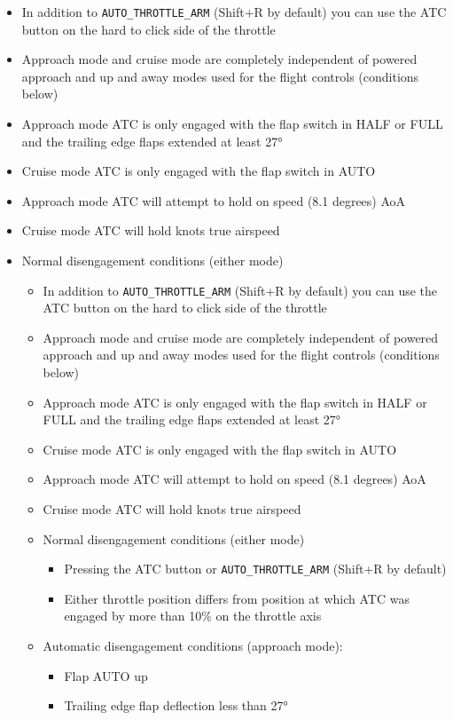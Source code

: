 \documentclass[11pt]{article}
\begin{document}
\begin{itemize}
\item In addition to \verb!AUTO_THROTTLE_ARM! (Shift+R by default) you can use the ATC button on the hard to click side of the throttle
\item Approach mode and cruise mode are completely independent of powered approach and up and away modes used for the flight controls (conditions below)
\item Approach mode ATC is only engaged with the flap switch in HALF or FULL and the trailing edge flaps extended at least 27°
\item Cruise mode ATC is only engaged with the flap switch in AUTO
\item Approach mode ATC will attempt to hold on speed (8.1 degrees) AoA
\item Cruise mode ATC will hold knots true airspeed
\item Normal disengagement conditions (either mode)
\begin{itemize}
\item In addition to \verb!AUTO_THROTTLE_ARM! (Shift+R by default) you can use the ATC button on the hard to click side of the throttle
\item Approach mode and cruise mode are completely independent of powered approach and up and away modes used for the flight controls (conditions below)
\item Approach mode ATC is only engaged with the flap switch in HALF or FULL and the trailing edge flaps extended at least 27°
\item Cruise mode ATC is only engaged with the flap switch in AUTO
\item Approach mode ATC will attempt to hold on speed (8.1 degrees) AoA
\item Cruise mode ATC will hold knots true airspeed
\item Normal disengagement conditions (either mode)
\begin{itemize}
\item Pressing the ATC button or \verb!AUTO_THROTTLE_ARM! (Shift+R by default)
\item Either throttle position differs from position at which ATC was engaged by more than 10\% on the throttle axis
\end{itemize}
\item Automatic disengagement conditions (approach mode):
\begin{itemize}
\item Flap AUTO up
\item Trailing edge flap deflection less than 27°

\end{itemize}
\end{itemize}
\end{itemize}
\end{document}
